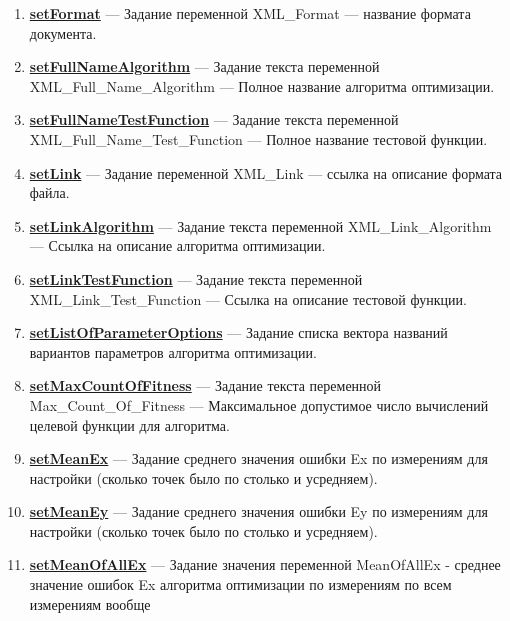 \documentclass[a4paper,12pt]{article}
\begin{document}
\begin{enumerate}
\item \textbf{\hyperref[setFormat]{setFormat}} --- Задание переменной XML\_Format --- название формата документа.

\item \textbf{\hyperref[setFullNameAlgorithm]{setFullNameAlgorithm}} --- Задание текста переменной  XML\_Full\_Name\_Algorithm --- Полное название алгоритма оптимизации.

\item \textbf{\hyperref[setFullNameTestFunction]{setFullNameTestFunction}} --- Задание текста переменной  XML\_Full\_Name\_Test\_Function --- Полное название тестовой функции.

\item \textbf{\hyperref[setLink]{setLink}} --- Задание переменной XML\_Link --- ссылка на описание формата файла.

\item \textbf{\hyperref[setLinkAlgorithm]{setLinkAlgorithm}} --- Задание текста переменной  XML\_Link\_Algorithm --- Ссылка на описание алгоритма оптимизации.

\item \textbf{\hyperref[setLinkTestFunction]{setLinkTestFunction}} --- Задание текста переменной  XML\_Link\_Test\_Function --- Ссылка на описание тестовой функции.

\item \textbf{\hyperref[setListOfParameterOptions]{setListOfParameterOptions}} --- Задание списка вектора названий вариантов параметров алгоритма оптимизации.

\item \textbf{\hyperref[setMaxCountOfFitness]{setMaxCountOfFitness}} --- Задание текста переменной  Max\_Count\_Of\_Fitness --- Максимальное допустимое число вычислений целевой функции для алгоритма.

\item \textbf{\hyperref[setMeanEx]{setMeanEx}} --- Задание среднего значения ошибки Ex по измерениям для настройки (сколько точек было по столько и усредняем).

\item \textbf{\hyperref[setMeanEy]{setMeanEy}} --- Задание среднего значения ошибки Ey по измерениям для настройки (сколько точек было по столько и усредняем).

\item \textbf{\hyperref[setMeanOfAllEx]{setMeanOfAllEx}} --- Задание значения переменной MeanOfAllEx - среднее значение ошибок Ex алгоритма оптимизации по измерениям по всем измерениям вообще


\end{enumerate}
\end{document}
